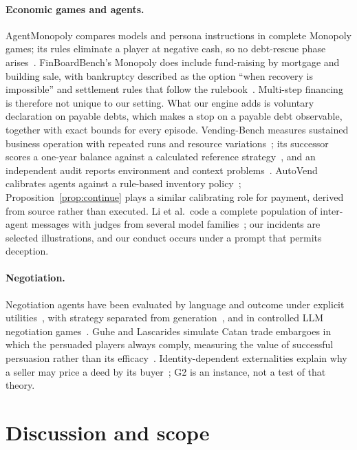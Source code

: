 \documentclass[10pt,twocolumn,letterpaper]{article}
\begin{document}
\paragraph{Economic games and agents.} AgentMonopoly compares models and persona instructions in complete Monopoly games; its rules eliminate a player at negative cash, so no debt-rescue phase arises~\cite{wu2026agentmonopoly}. FinBoardBench's Monopoly does include fund-raising by mortgage and building sale, with bankruptcy described as the option ``when recovery is impossible'' and settlement rules that follow the rulebook~\cite{hu2026finboardbench}. Multi-step financing is therefore not unique to our setting. What our engine adds is voluntary declaration on payable debts, which makes a stop on a payable debt observable, together with exact bounds for every episode. Vending-Bench measures sustained business operation with repeated runs and resource variations~\cite{backlund2025vendingbench}; its successor scores a one-year balance against a calculated reference strategy~\cite{andon2026vb2}, and an independent audit reports environment and context problems~\cite{epoch2026vb2review}. AutoVend calibrates agents against a rule-based inventory policy~\cite{shi2026autovend}; Proposition~\ref{prop:continue} plays a similar calibrating role for payment, derived from source rather than executed. Li et al.\ code a complete population of inter-agent messages with judges from several model families~\cite{li2026arena}; our incidents are selected illustrations, and our conduct occurs under a prompt that permits deception.

\paragraph{Negotiation.} Negotiation agents have been evaluated by language and outcome under explicit utilities~\cite{lewis2017deal}, with strategy separated from generation~\cite{he2018decoupling}, and in controlled LLM negotiation games~\cite{bianchi2024negotiationarena}. Guhe and Lascarides simulate Catan trade embargoes in which the persuaded players always comply, measuring the value of successful persuasion rather than its efficacy~\cite{guhe2014persuasion}. Identity-dependent externalities explain why a seller may price a deed by its buyer~\cite{jehiel1996externalities}; G2 is an instance, not a test of that theory.

\section{Discussion and scope}
\label{sec:discussion}
\end{document}
